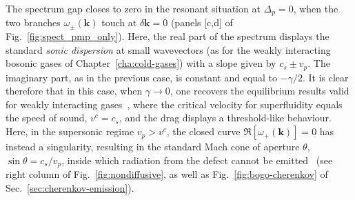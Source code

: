 The spectrum gap closes to zero in the resonant situation at
$\Delta_p=0$, when the two branches $\omega_{\pm} (\bm{k})$ touch at
$\delta \bm{k}=0$ (panels [c,d] of Fig.~\ref{fig:spect_pmp_only}).
%
Here, the real part of the spectrum displays the standard \emph{sonic
  dispersion} at small wavevectors (as for the weakly interacting
bosonic gases of Chapter~\ref{cha:cold-gases}) with a slope given by
$c_s \pm v_p$. The imaginary part, as in the previous case, is
constant and equal to $-\gamma/2$. It is clear therefore that in this
case, when $\gamma \to 0$, one recovers the equilibrium results valid
for weakly interacting gases~\cite{Astrakharchik_2004,Carusotto_2006},
where the critical velocity for superfluidity equals the speed of
sound, $v^c=c_s$, and the drag displays a threshold-like
behaviour. Here, in the supersonic regime $v_p > v^c$, the closed
curve $\Re[ \omega_{+} (\bm{k})] = 0$ has instead a singularity,
resulting in the standard Mach cone of aperture $\theta$, $\sin \theta
= c_s/v_p$, inside which radiation from the defect cannot be
emitted~\cite{Carusotto_2006} (see right column of
Fig.~\ref{fig:nondiffusive}, as well as Fig.~\ref{fig:bogo-cherenkov}
of Sec.~\ref{sec:cherenkov-emission}).

